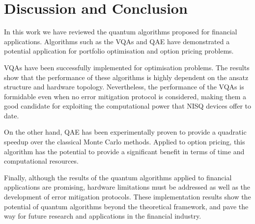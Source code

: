 \documentclass[prx,twocolumn,floatfix,superscriptaddress,longbibliography]{revtex4-1}
\begin{document}
\section{Discussion and Conclusion}\label{sec:discussion}
In this work we have reviewed the quantum algorithms proposed for financial applications. Algorithms such as the VQAs and QAE have demonstrated a potential application for portfolio optimisation and option pricing problems. 

VQAs have been successfully implemented for optimisation problems. The results show that the performance of these algorithms is highly dependent on the ansatz structure and hardware topology. Nevertheless, the performance of the VQAs is formidable even when no error mitigation protocol is considered, making them a good candidate for exploiting the computational power that NISQ devices offer to date.  

On the other hand, QAE has been experimentally proven to provide a quadratic speedup over the classical Monte Carlo methods. Applied to 
option pricing, this algorithm has the potential to provide a significant benefit in terms of time and computational 
resources.

Finally, although the results of the quantum algorithms applied to financial applications are promising, 
hardware limitations must be addressed as well as the development of error mitigation protocols. These  implementation results 
show the potential of quantum algorithms beyond the theoretical framework, and pave the way for future research and 
applications in the financial industry.

\FloatBarrier


\end{document}
